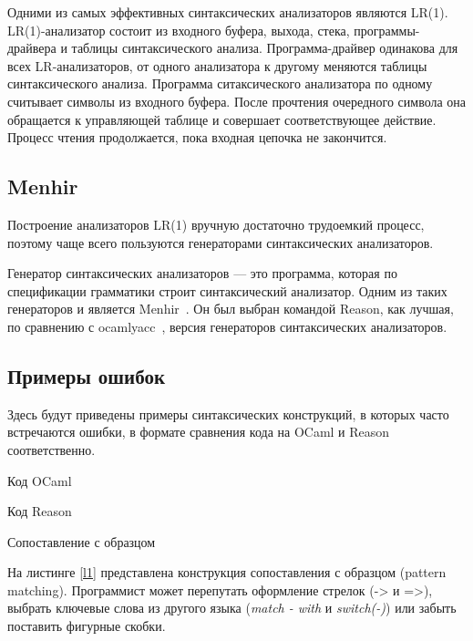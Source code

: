 Одними из самых эффективных синтаксических анализаторов являются LR(1)\cite{LRSpeed}. LR(1)-анализатор состоит из входного буфера, выхода, стека, программы-драйвера и таблицы синтаксического анализа. Программа-драйвер одинакова для всех LR-анализаторов, от одного анализатора к другому меняются таблицы синтаксического анализа. Программа ситаксического анализатора по одному считывает символы из входного буфера. После прочтения очередного символа она обращается к управляющей таблице и совершает соответствующее действие. Процесс чтения продолжается, пока входная цепочка не закончится.

\subsection{Menhir}
Построение анализаторов LR(1) вручную достаточно трудоемкий процесс, поэтому чаще всего пользуются генераторами синтаксических анализаторов. 

Генератор синтаксических анализаторов --- это программа, которая по спецификации грамматики строит синтаксический анализатор. Одним из таких генераторов и является Menhir~\cite{ME}. Он был выбран командой Reason, как лучшая, по сравнению с ocamlyacc~\cite{ocamlyacc}, версия генераторов синтаксических анализаторов.



\subsection{Примеры ошибок}

Здесь будут приведены примеры синтаксических конструкций, в которых часто встречаются ошибки, в формате сравнения кода на OCaml и Reason соответственно.

\hfill


\begin{example}
	\begin{subexample}[b]{\textwidth}
		
		\caption{Код OCaml}
	\end{subexample}
	\hfill
	
	\begin{subexample}[b]{\textwidth}
		
		\caption{Код Reason}
	\end{subexample}
\caption{Сопоставление с образцом}\label{l1}
\end{example}

На листинге \ref{l1} представлена конструкция сопоставления с образцом (pattern matching). Программист может перепутать оформление стрелок (-> и =>), выбрать ключевые слова из другого языка ({\it match - with} и {\it switch(-)}) или забыть поставить фигурные скобки.


